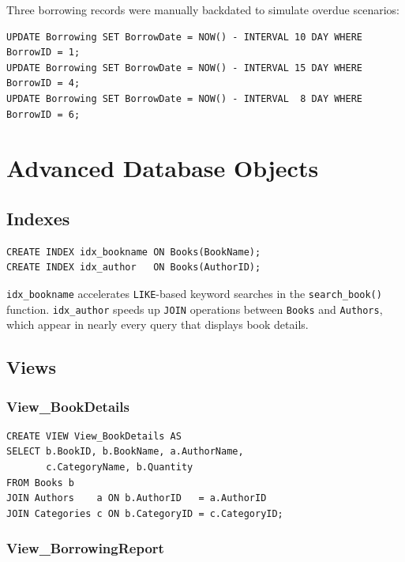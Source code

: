 \documentclass[12pt,a4paper,oneside]{report}
\begin{document}
Three borrowing records were manually backdated to simulate overdue scenarios:

\begin{lstlisting}[style=sqlstyle]
UPDATE Borrowing SET BorrowDate = NOW() - INTERVAL 10 DAY WHERE BorrowID = 1;
UPDATE Borrowing SET BorrowDate = NOW() - INTERVAL 15 DAY WHERE BorrowID = 4;
UPDATE Borrowing SET BorrowDate = NOW() - INTERVAL  8 DAY WHERE BorrowID = 6;
\end{lstlisting}

\chapter{Advanced Database Objects}

\section{Indexes}

\begin{lstlisting}[style=sqlstyle]
CREATE INDEX idx_bookname ON Books(BookName);
CREATE INDEX idx_author   ON Books(AuthorID);
\end{lstlisting}

\texttt{idx\_bookname} accelerates \texttt{LIKE}-based keyword searches in the
\texttt{search\_book()} function. \texttt{idx\_author} speeds up \texttt{JOIN} operations
between \texttt{Books} and \texttt{Authors}, which appear in nearly every query that
displays book details.

\section{Views}

\subsection{View\_BookDetails}

\begin{lstlisting}[style=sqlstyle, caption={View\_BookDetails}]
CREATE VIEW View_BookDetails AS
SELECT b.BookID, b.BookName, a.AuthorName,
       c.CategoryName, b.Quantity
FROM Books b
JOIN Authors    a ON b.AuthorID   = a.AuthorID
JOIN Categories c ON b.CategoryID = c.CategoryID;
\end{lstlisting}

\subsection{View\_BorrowingReport}
\end{document}
